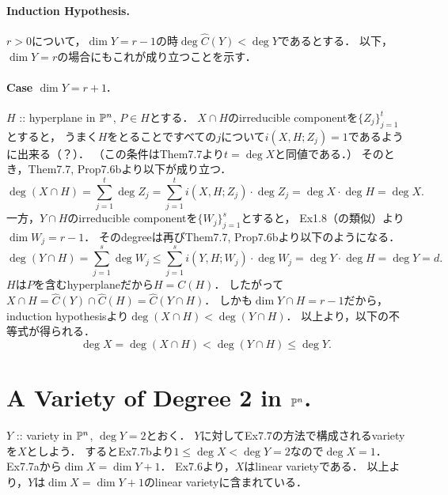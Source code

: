 \documentclass[a4paper]{jsarticle}
\begin{document}
    \paragraph{Induction Hypothesis.}
    $r>0$について，$\dim Y=r-1$の時$\deg \hat{C}(Y)<\deg Y$であるとする．
    以下，$\dim Y=r$の場合にもこれが成り立つことを示す．

    \paragraph{Case $\dim Y=r+1$.}
    $H$ :: hyperplane in $\mathbb{P}^n$, $P \in H$とする．
    $X \cap H$のirreducible componentを$\{Z_j\}_{j=1}^t$とすると，
    うまく$H$をとることですべての$j$について$i(X,H; Z_j)=1$であるように出来る（？）．
    （この条件はThem7.7より$t=\deg X$と同値である．）
    そのとき，Them7.7, Prop7.6bより以下が成り立つ．
    \[ \deg (X \cap H)=\sum_{j=1}^{t} \deg Z_j=\sum_{j=1}^{t} i(X, H; Z_j) \cdot \deg Z_j=\deg X \cdot \deg H=\deg X. \]
    一方，$Y \cap H$のirreducible componentを$\{W_j\}_{j=1}^s$とすると，
    Ex1.8（の類似）より$\dim W_j=r-1$．
    そのdegreeは再びThem7.7, Prop7.6bより以下のようになる．
    \[ \deg (Y \cap H)=\sum_{j=1}^{s} \deg W_j \leq \sum_{j=1}^{s} i(Y, H; W_j) \cdot \deg W_j=\deg Y \cdot \deg H=\deg Y=d. \]
    $H$は$P$を含むhyperplaneだから$H=C(H)$．
    したがって$X \cap H=\hat{C}(Y) \cap \hat{C}(H)=\hat{C}(Y \cap H)$．
    しかも$\dim Y \cap H=r-1$だから，
    induction hypothesisより$\deg (X \cap H)<\deg (Y \cap H)$．
    以上より，以下の不等式が得られる．
    \[ \deg X=\deg (X \cap H)<\deg (Y \cap H) \leq \deg Y. \]

\section{A Variety of Degree 2 in $\mathbb{P}^n$.} %
    $Y$ :: variety in $\mathbb{P}^n$, $\deg Y=2$とおく．
    $Y$に対してEx7.7の方法で構成されるvarietyを$X$としよう．
    するとEx7.7bより$1 \leq \deg X<\deg Y=2$なので$\deg X=1$．
    Ex7.7aから$\dim X=\dim Y+1$．
    Ex7.6より，$X$はlinear varietyである．
    以上より，$Y$は$\dim X=\dim Y+1$のlinear varietyに含まれている．
\end{document}
